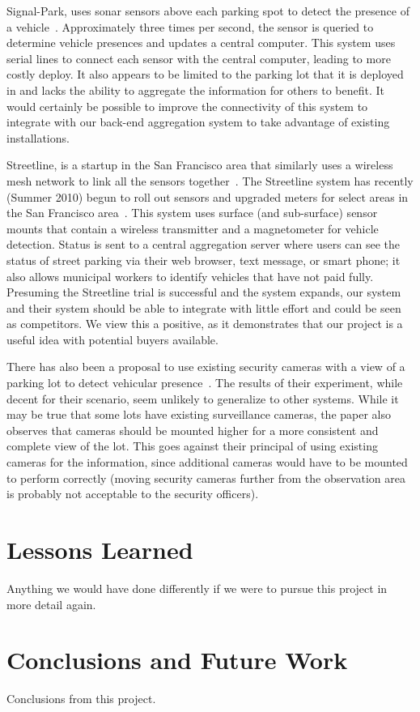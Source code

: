 \documentclass{acm_proc}
\begin{document}
Signal-Park, uses sonar sensors above each parking spot to detect the
presence of a vehicle~\cite{pgi:signal-park}.
Approximately three times per second, the sensor is queried to determine
vehicle presences and updates a central computer.
This system uses serial lines to connect each sensor with the central
computer, leading to more costly deploy.
It also appears to be limited to the parking lot that it is deployed in and
lacks the ability to aggregate the information for others to benefit.
It would certainly be possible to improve the connectivity of this system
to integrate with our back-end aggregation system to take advantage of
existing installations.

Streetline, is a startup in the San Francisco area that similarly uses a
wireless mesh network to link all the sensors
together~\cite{pgi:streetline}.
The Streetline system has recently (Summer 2010) begun to roll out sensors
and upgraded meters for select areas in the San Francisco
area~\cite{wired:streetline, sfpark}.
This system uses surface (and sub-surface) sensor mounts that contain a
wireless transmitter and a magnetometer for vehicle detection.
Status is sent to a central aggregation server where users can see the
status of street parking via their web browser, text message, or smart
phone; it also allows municipal workers to identify vehicles that have not
paid fully.
Presuming the Streetline trial is successful and the system expands, our
system and their system should be able to integrate with little effort and
could be seen as competitors.
We view this a positive, as it demonstrates that our project is a useful
idea with potential buyers available.

There has also been a proposal to use existing security cameras with a view
of a parking lot to detect vehicular presence~\cite{lin:vision-parking}.
The results of their experiment, while decent for their scenario, seem
unlikely to generalize to other systems.
While it may be true that some lots have existing surveillance cameras, the
paper also observes that cameras should be mounted higher for a more
consistent and complete view of the lot.
This goes against their principal of using existing cameras for the
information, since additional cameras would have to be mounted to perform
correctly (moving security cameras further from the observation area is
probably not acceptable to the security officers).

\section{Lessons Learned}\label{sec:lessons}

Anything we would have done differently if we were to pursue this project
in more detail again.

\section{Conclusions and Future Work}\label{sec:conclusions}

Conclusions from this project.



\end{document}
